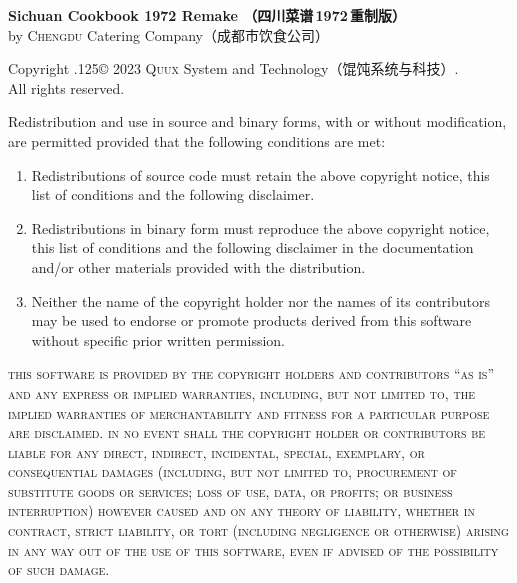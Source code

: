 \enlargethispage{.664176\baselineskip}%
\begingroup%
\footnotesize%
\singlespacing%
\setlength{\parindent}{0pt}%
\setlength{\parskip}{.1875\baselineskip}%
{\sffamily\bfseries Sichuan Cookbook 1972 Remake\!%
（四川菜谱\,1972\,重制版）}\\
by \textsc{Chengdu} Catering Company\!（成都市饮食公司）

\null

Copyright {\lower.125\baselineskip\hbox{\normalsize\copyright}} 2023
\textsc{Quux} System and Technology\!（馄饨系统与科技）\!\!.\\%
All rights reserved.

Redistribution and use in source and binary forms, with or without
modification, are permitted provided that the following conditions are met:

\begin{enumerate}
\item Redistributions of source code must retain the above copyright notice,
      this list of conditions and the following disclaimer.

\item Redistributions in binary form must reproduce the above copyright notice,
      this list of conditions and the following disclaimer in the documentation
      and/or other materials provided with the distribution.

\item Neither the name of the copyright holder nor the names of its
      contributors may be used to endorse or promote products derived from
      this software without specific prior written permission.
\end{enumerate}

\begingroup%
%
\textsc{this software is provided by the copyright holders and contributors
``as is'' and any express or implied warranties, including, but not limited to,
the implied warranties of merchantability and fitness for a particular purpose
are disclaimed. in no event shall the copyright holder or contributors be
liable for any direct, indirect, incidental, special, exemplary, or
consequential damages (including, but not limited to, procurement of
substitute goods or services; loss of use, data, or profits; or business
interruption) however caused and on any theory of liability, whether in
contract, strict liability, or tort (including negligence or otherwise)
arising in any way out of the use of this software, even if advised of the
possibility of such damage.}

